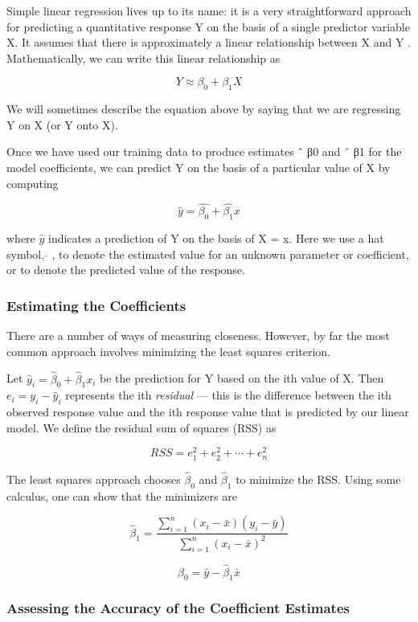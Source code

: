 \documentclass{article}
\theoremstyle{definition}
\theoremstyle{remark}
\begin{document}
	Simple linear regression lives up to its name: it is a very straightforward approach for predicting a quantitative response Y on the basis of a single predictor variable X. It assumes that there is approximately a linear relationship between X and Y . Mathematically, we can write this linear relationship as
	
	\[
	Y\approx \beta_0+\beta_1X
	\]
	
	We will sometimes describe the equation above by saying that we are regressing Y on X (or Y onto X).
	
	Once we have used our training data to produce estimates ˆ β0 and ˆ β1 for the model coefficients, we can predict Y on the basis of a particular value of X by computing
	
	\[
	\hat{y}=\hat{\beta_0}+\hat{\beta_1}x
	\]
	
	where $\hat{y}$ indicates a prediction of Y on the basis of X = x. Here we use a hat symbol, $\hat{ }$ , to denote the estimated value for an unknown parameter or coefficient, or to denote the predicted value of the response.
	
	\subsubsection*{Estimating the Coefficients}
	
	There are a number of ways of measuring closeness. However, by far the most common approach involves minimizing the least squares criterion.
	
	Let $\hat{y}_i=\hat{\beta}_0+\hat{\beta}_1x_i$ be the prediction for Y based on the ith value of X. Then $e_i=y_i-\hat{y}_i$ represents the ith \textit{residual} --- this is the difference between the ith observed response value and the ith response value that is predicted by our linear model. We define the residual sum of squares (RSS) as
	
	\[
	RSS=e_1^2+e_2^2+\cdots+e_n^2
	\]
	
	The least squares approach chooses $\hat{\beta}_0$ and $\hat{\beta}_1$ to minimize the RSS. Using some calculus, one can show that the minimizers are
	
	\[
	\hat{\beta}_1=\frac{\sum^n_{i=1}(x_i-\bar{x})(y_i-\bar{y})}{\sum^n_{i=1}(x_i-\bar{x})^2}
	\]
	
	\[
	\hat{\beta}_0=\bar{y}-\hat{\beta}_1\bar{x}
	\]
	
	\subsubsection*{Assessing the Accuracy of the Coefficient Estimates}
	
\end{document}
